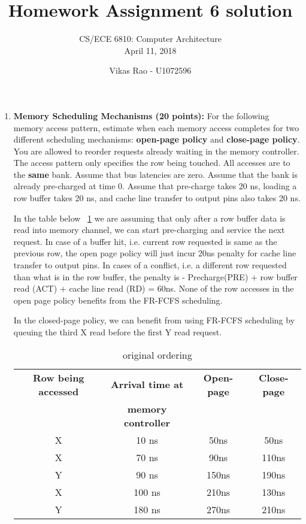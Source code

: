 \documentclass[a4paper, 11pt]{exam}
\title{Homework Assignment 6 solution}
\subtitle{CS/ECE 6810: Computer Architecture \\
April 11, 2018}
\author{ Vikas Rao - U1072596}
\begin{document}
\maketitle
\vspace{0.2in}


\begin{enumerate}
 \item \textbf{Memory Scheduling Mechanisms (20 points): } For the following memory access pattern, estimate when each memory access completes for two different scheduling mechanisms: \textbf{open-page policy} and \textbf{close-page policy}. You are allowed to reorder requests already waiting in the memory controller. The access pattern only specifies the row being touched. All accesses are to the \textbf{same} bank. Assume that bus latencies are zero. Assume that the bank is already pre-charged at time 0. Assume that pre-charge takes 20 ns, loading a row buffer takes 20 ns, and cache line transfer to output pins also takes 20 ns.\newline

In the table below ~\ref{oriorder} we are assuming that only after a row buffer data is read into memory channel, we can start pre-charging and service the next request. In case of a buffer hit, i.e. current row requested is same as the previous row, the open page policy will just incur 20ns penalty for cache line transfer to output pins. In cases of a conflict, i.e. a different row requested than what is in the row buffer, the penalty is - Precharge(PRE) + row buffer read (ACT) + cache line read (RD) = 60ns. None of the row accesses in the open page policy benefits from the FR-FCFS scheduling. 

In the closed-page policy, we can benefit from using FR-FCFS scheduling  by queuing the third X read before the first Y read request. 

\begin{table}[hbt]
\begin{center}
\caption{original ordering}
\label{oriorder}
\begin{tabular}{|c|c|c|c|}
 \hline
 \textbf{Row being accessed} & \textbf{Arrival time at} & \textbf{Open-page} & \textbf{Close-page} \\
  & \textbf{memory controller} & & \\
 \hline
 X  & 10 ns & 50ns & 50ns \\
 \hline
 X  & 70 ns & 90ns & 110ns\\
 \hline
 Y  & 90 ns & 150ns & 190ns\\
 \hline
 X  & 100 ns & 210ns & 130ns\\
 \hline
 Y  & 180 ns & 270ns & 210ns\\
 \hline
 \end{tabular}
 \end{center}
\end{table}


\end{enumerate}
\end{document}
